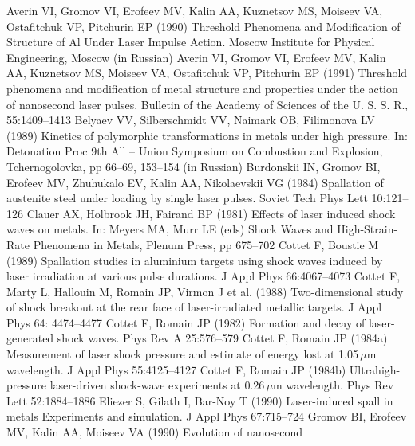 \documentclass[sw,bibself]{svjour}
\begin{document}
\begin{thebibliography}{88.}
Averin VI, Gromov VI, Erofeev MV, Kalin AA, Kuznetsov MS, Moiseev VA,
Ostafitchuk VP, Pitchurin EP (1990) Threshold Phenomena and Modification
of Structure of Al Under Laser Impulse Action.
Moscow Institute for Physical Engineering, Moscow (in Russian)
Averin VI, Gromov VI, Erofeev MV, Kalin AA, Kuznetsov MS, Moiseev VA,
Ostafitchuk VP, Pitchurin EP (1991) Threshold phenomena and modification
of metal structure and properties under the action of nanosecond
laser pulses. Bulletin of the Academy of Sciences of the U. S. S. R.,
55:1409--1413
Belyaev VV, Silberschmidt VV, Naimark OB, Filimonova LV (1989)
Kinetics of polymorphic transformations in metals under high pressure.
In: Detonation Proc 9th All -- Union Symposium on Combustion and Explosion,
Tchernogolovka, pp 66--69, 153--154 (in Russian)
Burdonskii IN, Gromov BI, Erofeev MV, Zhuhukalo EV, Kalin AA,
Nikolaevskii VG (1984) Spallation of austenite steel under loading
by single laser pulses. Soviet Tech Phys Lett 10:121--126
Clauer AX, Holbrook JH, Fairand BP (1981) Effects of laser induced
shock waves on metals. In: Meyers MA, Murr LE (eds) Shock Waves and
High-Strain-Rate Phenomena in Metals, Plenum Press, pp 675--702
Cottet F, Boustie M (1989) Spallation studies in aluminium targets
using shock waves induced by laser irradiation at various pulse durations.
J Appl Phys 66:4067--4073
Cottet F, Marty L, Hallouin M, Romain JP, Virmon J et al. (1988)
Two-dimensional study of shock breakout at the rear face of laser-irradiated
metallic targets. J Appl Phys 64: 4474--4477
Cottet F, Romain JP (1982) Formation and decay of laser-generated
shock waves. Phys Rev A 25:576--579
\newpage
{}
Cottet F, Romain JP (1984a) Measurement of laser shock pressure and
estimate of energy lost at 1.05$\,\mu$m wavelength. J Appl Phys
55:4125--4127
Cottet F, Romain JP (1984b) Ultrahigh-pressure laser-driven shock-wave
experiments at 0.26$\,\mu$m wavelength. Phys Rev Lett 52:1884--1886
Eliezer S, Gilath I, Bar-Noy T (1990) Laser-induced spall in metals
Experiments and simulation. J Appl Phys 67:715--724
Gromov BI, Erofeev MV, Kalin AA, Moiseev VA (1990) Evolution of nanosecond

\end{thebibliography}
\end{document}
